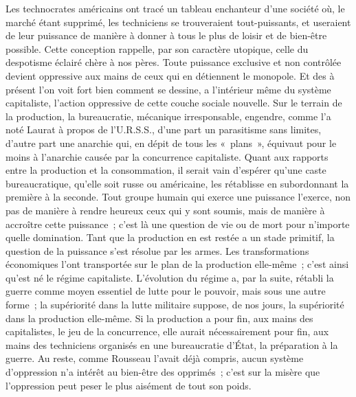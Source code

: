 \documentclass[french,twoside]{book} %
\begin{document}
Les technocrates américains ont tracé un tableau enchanteur d'une société où, le marché étant supprimé, les techniciens se trouveraient tout-puissants, et useraient de leur puissance de manière à donner à tous le plus de loisir et de bien-être possible. Cette conception rappelle, par son caractère utopique, celle du despotisme éclairé chère à nos pères. Toute puissance exclusive et non contrôlée devient oppressive aux mains de ceux qui en détiennent le monopole. Et des à présent l'on voit fort bien comment se dessine, a l'intérieur même du système capitaliste, l'action oppressive de cette couche sociale nouvelle. Sur le terrain de la production, la bureaucratie, mécanique irresponsable, engendre, comme l'a noté Laurat à propos de l'U.R.S.S., d'une part un parasitisme sans limites, d'autre part une anarchie qui, en dépit de tous les « plans », équivaut pour le moins à l'anarchie causée par la concurrence capitaliste. Quant aux rapports entre la production et la consommation, il serait vain d'espérer qu'une caste bureaucratique, qu'elle soit russe ou américaine, les rétablisse en subordonnant la première à la seconde. Tout groupe humain qui exerce une puissance l'exerce, non pas de manière à rendre heureux ceux qui y sont soumis, mais de manière à accroître cette puissance ; c'est là une question de vie ou de mort pour n'importe quelle domination. Tant que la production en est restée a un stade primitif, la question de la puissance s'est résolue par les armes. Les transformations économiques l'ont transportée sur le plan de la production elle-même ; c'est ainsi qu'est né le régime capitaliste. L'évolution du régime a, par la suite, rétabli la guerre comme moyen essentiel de lutte pour le pouvoir, mais sous une autre forme ; la supériorité dans la lutte militaire suppose, de nos jours, la supériorité dans la production elle-même. Si la production a pour fin, aux mains des capitalistes, le jeu de la concurrence, elle aurait nécessairement pour fin, aux mains des techniciens organisés en une bureaucratie d'État, la préparation à la guerre. Au reste, comme Rousseau l'avait déjà compris, aucun système d'oppression n'a intérêt au bien-être des opprimés ; c'est sur la misère que l'oppression peut peser le plus aisément de tout son poids.\par
\end{document}
